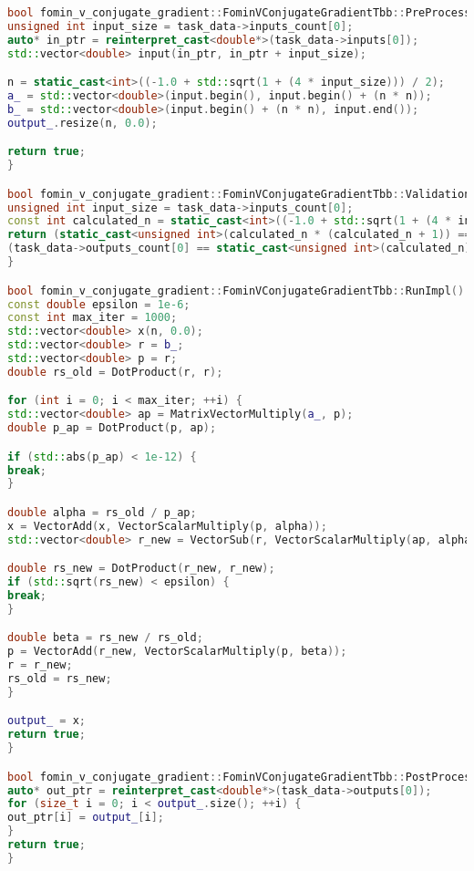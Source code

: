 \documentclass[12pt]{article}
\begin{document}
\begin{lstlisting}[language=C++]
bool fomin_v_conjugate_gradient::FominVConjugateGradientTbb::PreProcessingImpl() {
unsigned int input_size = task_data->inputs_count[0];
auto* in_ptr = reinterpret_cast<double*>(task_data->inputs[0]);
std::vector<double> input(in_ptr, in_ptr + input_size);

n = static_cast<int>((-1.0 + std::sqrt(1 + (4 * input_size))) / 2);
a_ = std::vector<double>(input.begin(), input.begin() + (n * n));
b_ = std::vector<double>(input.begin() + (n * n), input.end());
output_.resize(n, 0.0);

return true;
}

bool fomin_v_conjugate_gradient::FominVConjugateGradientTbb::ValidationImpl() {
unsigned int input_size = task_data->inputs_count[0];
const int calculated_n = static_cast<int>((-1.0 + std::sqrt(1 + (4 * input_size))) / 2);
return (static_cast<unsigned int>(calculated_n * (calculated_n + 1)) == input_size) &&
(task_data->outputs_count[0] == static_cast<unsigned int>(calculated_n));
}

bool fomin_v_conjugate_gradient::FominVConjugateGradientTbb::RunImpl() {
const double epsilon = 1e-6;
const int max_iter = 1000;
std::vector<double> x(n, 0.0);
std::vector<double> r = b_;
std::vector<double> p = r;
double rs_old = DotProduct(r, r);

for (int i = 0; i < max_iter; ++i) {
std::vector<double> ap = MatrixVectorMultiply(a_, p);
double p_ap = DotProduct(p, ap);

if (std::abs(p_ap) < 1e-12) {
break;
}

double alpha = rs_old / p_ap;
x = VectorAdd(x, VectorScalarMultiply(p, alpha));
std::vector<double> r_new = VectorSub(r, VectorScalarMultiply(ap, alpha));

double rs_new = DotProduct(r_new, r_new);
if (std::sqrt(rs_new) < epsilon) {
break;
}

double beta = rs_new / rs_old;
p = VectorAdd(r_new, VectorScalarMultiply(p, beta));
r = r_new;
rs_old = rs_new;
}

output_ = x;
return true;
}

bool fomin_v_conjugate_gradient::FominVConjugateGradientTbb::PostProcessingImpl() {
auto* out_ptr = reinterpret_cast<double*>(task_data->outputs[0]);
for (size_t i = 0; i < output_.size(); ++i) {
out_ptr[i] = output_[i];
}
return true;
}
\end{lstlisting}
\begin{lstlisting}[language=C++]

\end{lstlisting}
\newpage
\end{document}
